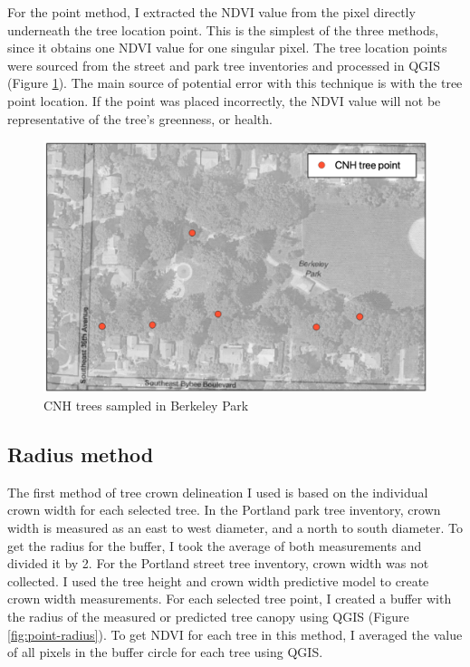 \documentclass[12pt,twoside]{reedthesis}
\begin{document}
For the point method, I extracted the NDVI value from the
pixel directly underneath the tree location point. This is the simplest
of the three methods, since it obtains one NDVI value for one singular
pixel. The tree location points were sourced from the street and park
tree inventories and processed in QGIS (Figure \ref{fig:point-method}).
The main source of potential error with this technique is with the tree
point location. If the point was placed incorrectly, the NDVI value will
not be representative of the tree's greenness, or health.
\begin{figure}[H]

{\centering \includegraphics[width=0.8\linewidth,]{figure/points} 

}

\caption{CNH trees sampled in Berkeley Park}\label{fig:point-method}
\end{figure}
\hypertarget{radiusmethod}{%
\subsection{Radius method}\label{radiusmethod}}

The first method of tree crown delineation I used is based on the
individual crown width for each selected tree. In the Portland park tree
inventory, crown width is measured as an east to west diameter, and a
north to south diameter. To get the radius for the buffer, I took the
average of both measurements and divided it by 2. For the Portland
street tree inventory, crown width was not collected. I used the tree
height and crown width predictive model to create crown width
measurements. For each selected tree point, I created a buffer with the
radius of the measured or predicted tree canopy using QGIS (Figure
\ref{fig:point-radius}). To get NDVI for each tree in this method, I
averaged the value of all pixels in the buffer circle for each tree
using QGIS.
\end{document}

